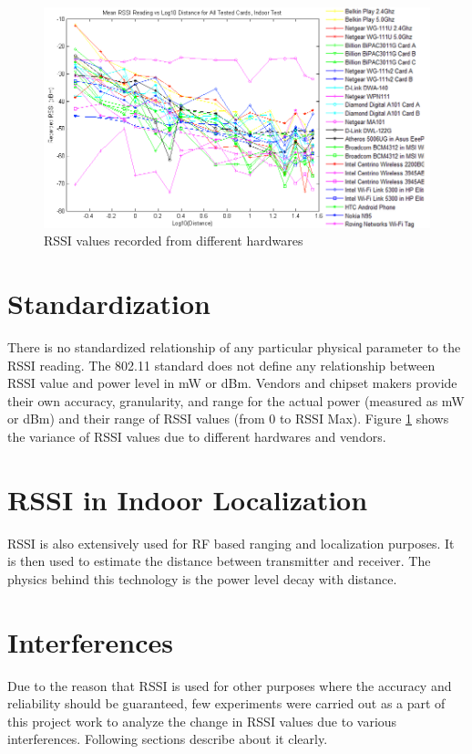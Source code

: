 \documentclass[11pt,a4paper,headinclude,footinclude,chapterprefix=on]{scrreprt}
\begin{document}
\begin{figure}
	[!h] \centering 
	\includegraphics[width=15cm]{Images/rssi_vendor1.png} \caption{RSSI values recorded from different hardwares} \label{fig:rssi_vendors} 
\end{figure}

\section{Standardization}
There is no standardized relationship of any particular physical parameter to the RSSI reading. The 802.11 standard does not define any relationship between RSSI value and power level in mW or dBm. Vendors and chipset makers provide their own accuracy, granularity, and range for the actual power (measured as mW or dBm) and their range of RSSI values (from 0 to RSSI Max). Figure \ref{fig:rssi_vendors} shows the variance of RSSI values due to different hardwares and vendors.

\section{RSSI in Indoor Localization}
RSSI is also extensively used for RF based ranging and localization purposes. It is then used to estimate the distance between
transmitter and receiver. The physics behind this technology
is the power level decay with distance. 

\section{Interferences}
Due to the reason that RSSI is used for other purposes where the accuracy and reliability should be guaranteed, few experiments were carried out as a part of this project work to analyze the change in RSSI values due to various interferences. Following sections describe about it clearly.
\end{document}
